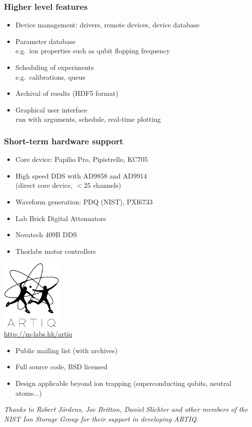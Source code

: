 \documentclass[final,presentation,compress]{beamer}
\begin{document}
\begin{frame}
  \frametitle{Higher level features}
  \footnotesize
  \begin{itemize}
  \item Device management: drivers, remote devices, device database
  \item Parameter database \\
       e.g.\ ion properties such as qubit flopping frequency
  \item Scheduling of experiments \\
      e.g.\ calibrations, queue
  \item Archival of results (HDF5 format)
  \item Graphical user interface \\ 
  	run with arguments, schedule, real-time plotting
  \end{itemize}
\end{frame}


\begin{frame}
  \frametitle{Short-term hardware support}
  \footnotesize
  \begin{itemize}
  \item Core device: Papilio Pro, Pipistrello, KC705
  \item High speed DDS with AD9858 and AD9914 \\
  	(direct core device, $ < 25$ channels)
  \item Waveform generation: PDQ (NIST), PXI6733
  \item Lab Brick Digital Attenuators
  \item Novatech 409B DDS
  \item Thorlabs motor controllers
  \end{itemize}
\end{frame}  

\begin{frame}
  \begin{center}
  \includegraphics[width=3cm]{../../logo/artiq.pdf} \\
  \url{http://m-labs.hk/artiq}
  \end{center}

  \footnotesize
  \begin{itemize}
    \item Public mailing list (with archives)
    \item Full source code, BSD licensed
    \item Design applicable beyond ion trapping (superconducting qubits,
      neutral atoms...)
  \end{itemize}
  \textit{Thanks to Robert J\"ordens, Joe Britton, Daniel Slichter and other members of the NIST Ion Storage Group for their support in developing ARTIQ.}

\end{frame}
\end{document}
